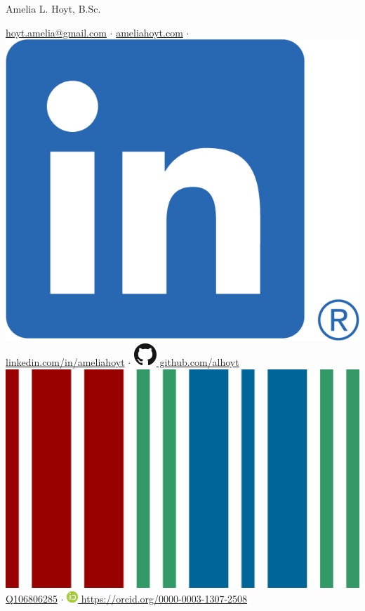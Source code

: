 \documentclass[12pt,a4paper,sans]{moderncv} %
\begin{document}
{\Huge Amelia L. Hoyt, B.Sc.}

    \vspace{3mm}

    \href{mailto:hoyt.amelia@gmail.com}{hoyt.amelia@gmail.com}
    $\cdot$
    \href{http://ameliahoyt.com}{ameliahoyt.com}
    $\cdot$
    \href{https://linkedin.com/in/ameliahoyt}{\includegraphics[scale=0.055]{img/LI-In-Bug} linkedin.com/in/ameliahoyt}
    $\cdot$
    \href{https://github.com/alhoyt}{\includegraphics[scale=0.25]{img/GitHub-Mark-32px} github.com/alhoyt}
    \\
    \href{https://www.wikidata.org/wiki/Q106806285}{\includegraphics[scale=0.01]{img/wikidata_logo} Q106806285}
    $\cdot$
    \href{https://orcid.org/0000-0003-1307-2508}{\includegraphics[scale=0.5]{img/ORCIDiD_icon16x16} https://orcid.org/0000-0003-1307-2508}
\end{document}
